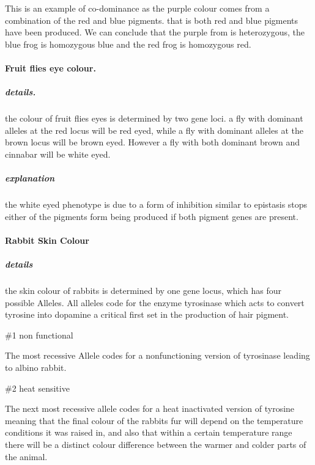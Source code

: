 \documentclass[]{article}
\let\oldparagraph\paragraph
\renewcommand{\paragraph}[1]{\oldparagraph{#1}\mbox{}}
\let\oldsubparagraph\subparagraph
\renewcommand{\subparagraph}[1]{\oldsubparagraph{#1}\mbox{}}
\begin{document}
This is an example of co-dominance as the purple colour comes from a
combination of the red and blue pigments. that is both red and blue
pigments have been produced. We can conclude that the purple from is
heterozygous, the blue frog is homozygous blue and the red frog is
homozygous red.

\hypertarget{fruit-flies-eye-colour.}{%
\paragraph{Fruit flies eye colour.}\label{fruit-flies-eye-colour.}}

\hypertarget{details.}{%
\subparagraph{details.}\label{details.}}

the colour of fruit flies eyes is determined by two gene loci. a fly
with dominant alleles at the red locus will be red eyed, while a fly
with dominant alleles at the brown locus will be brown eyed. However a
fly with both dominant brown and cinnabar will be white eyed.

\hypertarget{explanation-1}{%
\subparagraph{explanation}\label{explanation-1}}

the white eyed phenotype is due to a form of inhibition similar to
epistasis stops either of the pigments form being produced if both
pigment genes are present.

\hypertarget{rabbit-skin-colour}{%
\paragraph{Rabbit Skin Colour}\label{rabbit-skin-colour}}

\hypertarget{details-1}{%
\subparagraph{details}\label{details-1}}

the skin colour of rabbits is determined by one gene locus, which has
four possible Alleles. All alleles code for the enzyme tyrosinase which
acts to convert tyrosine into dopamine a critical first set in the
production of hair pigment.

\#1 non functional

The most recessive Allele codes for a nonfunctioning version of
tyrosinase leading to albino rabbit.

\#2 heat sensitive

The next most recessive allele codes for a heat inactivated version of
tyrosine meaning that the final colour of the rabbits fur will depend on
the temperature conditions it was raised in, and also that within a
certain temperature range there will be a distinct colour difference
between the warmer and colder parts of the animal.
\end{document}
